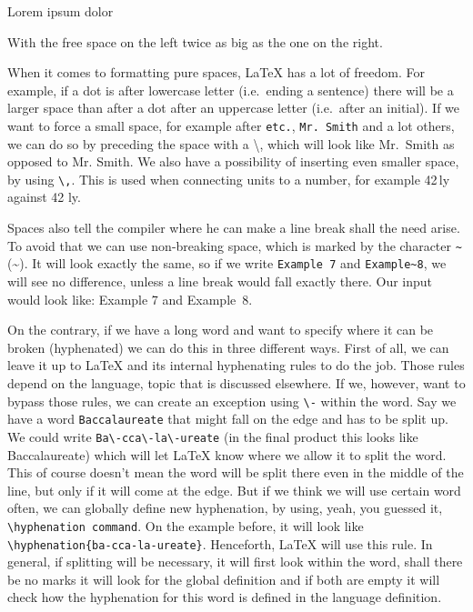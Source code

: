 Lorem \hfill \hfill ipsum \hfill dolor

With the free space on the left twice as big as the one on the right.

When it comes to formatting pure spaces, \LaTeX{} has a lot of freedom. For example, if a dot is after lowercase letter (i.e.\ ending a sentence) there will be a larger space than after a dot after an uppercase letter (i.e.\ after an initial). If we want to force a small space, for example after \verb|etc.|, \verb|Mr. Smith| and a lot others, we can do so by preceding the space with a \textbackslash, which will look like Mr.\ Smith as opposed to Mr. Smith. We also have a possibility of inserting even smaller space, by using \verb|\,|. This is used when connecting units to a number, for example 42\,ly against 42 ly.

Spaces also tell the compiler where he can make a line break shall the need arise. To avoid that we can use non-breaking space, which is marked by the character \verb|~| (\textasciitilde{}). It will look exactly the same, so if we write \verb|Example 7| and \verb|Example~8|, we will see no difference, unless a line break would fall exactly there. Our input would look like: Example 7 and Example~8.

On the contrary, if we have a long word and want to specify where it can be broken (hyphenated) we can do this in three different ways. First of all, we can leave it up to \LaTeX{} and its internal hyphenating rules to do the job. Those rules depend on the language, topic that is discussed elsewhere. If we, however, want to bypass those rules, we can create an exception using \verb|\-| within the word. Say we have a word \verb|Baccalaureate| that might fall on the edge and has to be split up. We could write \verb|Ba\-cca\-la\-ureate| (in the final product this looks like Ba\-cca\-la\-ureate) which will let \LaTeX{} know where we allow it to split the word. This of course doesn't mean the word will be split there even in the middle of the line, but only if it will come at the edge. But if we think we will use certain word often, we can globally define new hyphenation, by using, yeah, you guessed it, \verb|\hyphenation command|. On the example before, it will look like \verb|\hyphenation{ba-cca-la-ureate}|. Henceforth, \LaTeX{} will use this rule. In general, if splitting will be necessary, it will first look within the word, shall there be no marks it will look for the global definition and if both are empty it will check how the hyphenation for this word is defined in the language definition.